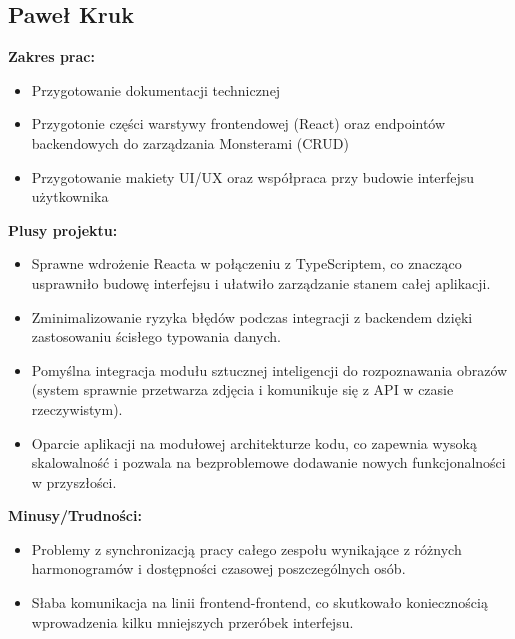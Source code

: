 \documentclass[12pt,a4paper]{article}
\begin{document}
\subsection{Paweł Kruk}
\textbf{Zakres prac:}
\begin{itemize}
    \item Przygotowanie dokumentacji technicznej
    \item Przygotonie części warstywy frontendowej (React) oraz endpointów backendowych do zarządzania Monsterami (CRUD)
    \item Przygotowanie makiety UI/UX oraz współpraca przy budowie interfejsu użytkownika
\end{itemize}
\textbf{Plusy projektu:} 
\begin{itemize}
    \item Sprawne wdrożenie Reacta w połączeniu z TypeScriptem, co znacząco usprawniło budowę interfejsu i ułatwiło zarządzanie stanem całej aplikacji.
    \item Zminimalizowanie ryzyka błędów podczas integracji z backendem dzięki zastosowaniu ścisłego typowania danych.
    \item Pomyślna integracja modułu sztucznej inteligencji do rozpoznawania obrazów (system sprawnie przetwarza zdjęcia i komunikuje się z API w czasie rzeczywistym).
    \item Oparcie aplikacji na modułowej architekturze kodu, co zapewnia wysoką skalowalność i pozwala na bezproblemowe dodawanie nowych funkcjonalności w przyszłości.
\end{itemize}
\textbf{Minusy/Trudności:} 
\begin{itemize}
    \item Problemy z synchronizacją pracy całego zespołu wynikające z różnych harmonogramów i dostępności czasowej poszczególnych osób.
    \item Słaba komunikacja na linii frontend-frontend, co skutkowało koniecznością wprowadzenia kilku mniejszych przeróbek interfejsu.
\end{itemize}

\newpage
\end{document}
